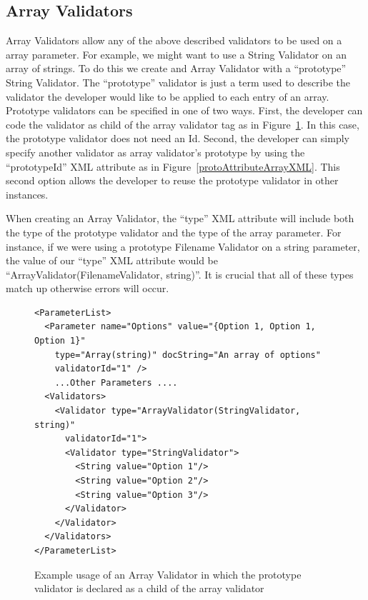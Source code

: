 \subsection{Array Validators}
Array Validators allow any of the above described validators to be used on a array parameter. For example, we might want to use a
String Validator on an array of strings. To do this we create and Array Validator with a ``prototype'' String Validator. The 
``prototype'' validator is just a term used to describe the validator the developer would like to be applied to each entry of an
array. Prototype validators can be specified in one of two ways. First, the developer can code the validator as child of the array validator
tag as in Figure~\ref{actualArrayValidatorXML}. In this case, the prototype validator does not need an Id. 
Second, the developer can simply specify another validator as array validator's  prototype by using the
``prototypeId'' XML attribute as in Figure~\ref{protoAttributeArrayXML}. This second option allows the developer to reuse the prototype validator in 
other instances.

When creating an Array Validator, the ``type'' XML attribute will include both the type of the prototype validator and the type of the array
parameter. For instance, if we were using a prototype Filename Validator on a string parameter, the value of our ``type'' XML attribute would
be ``ArrayValidator(FilenameValidator, string)''. It is crucial that all of these types match up otherwise errors will occur.

\begin{figure}
\centering
{\footnotesize
\begin{verbatim}
<ParameterList>
  <Parameter name="Options" value="{Option 1, Option 1, Option 1}" 
    type="Array(string)" docString="An array of options" 
    validatorId="1" />
    ...Other Parameters ....
  <Validators>
    <Validator type="ArrayValidator(StringValidator, string)" 
      validatorId="1">
      <Validator type="StringValidator">
        <String value="Option 1"/>
        <String value="Option 2"/>
        <String value="Option 3"/>
      </Validator>
    </Validator>
  </Validators>
</ParameterList>
\end{verbatim}
}
\caption{Example usage of an Array Validator in which the prototype validator is declared as a child of the array validator}
\label{actualArrayValidatorXML}
\end{figure}

